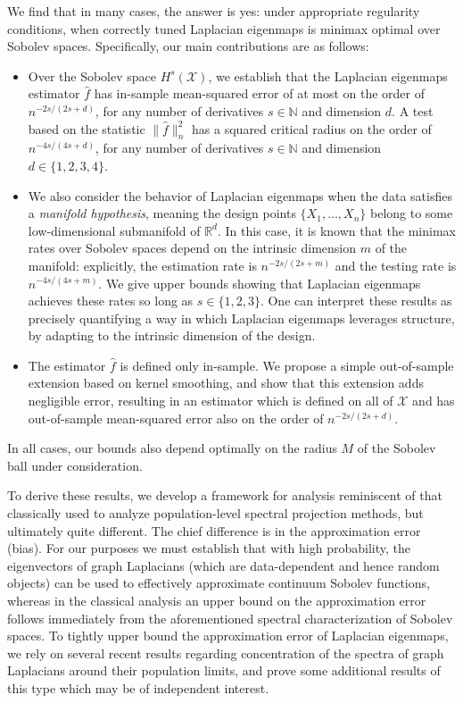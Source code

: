 \documentclass[aos]{imsart}
\theoremstyle{plain}
\theoremstyle{definition}
\theoremstyle{remark}
\def\R{\mathbb{R}}
\newcommand{\wh}[1]{\widehat{#1}}
\newcommand{\mc}[1]{\mathcal{#1}}
\newcommand{\Reals}{\mathbb{R}} %
\newcommand{\Rd}{\Reals^d}
\newcommand{\1}{\mathbf{1}}
\begin{document}
We find that in many cases, the answer is yes: under appropriate regularity conditions, when correctly tuned Laplacian eigenmaps is minimax optimal over Sobolev spaces. Specifically, our main contributions are as follows:
\begin{itemize}
	\item Over the Sobolev space $H^{s}(\mc{X})$, we establish that the Laplacian eigenmaps estimator $\wh{f}$ has in-sample mean-squared error of at most on the order of $n^{-2s/(2s + d)}$, for any number of derivatives $s \in \mathbb{N}$ and dimension $d$. A test based on the statistic $\|\wh{f}\|_n^2$ has a squared critical radius on the order of $n^{-4s/(4s + d)}$, for any number of derivatives $s \in \mathbb{N}$ and dimension $d \in \{1,2,3,4\}$. 
	\item We also consider the behavior of Laplacian eigenmaps when the data satisfies a \emph{manifold hypothesis}, meaning the design points $\{X_1,\ldots,X_n\}$ belong to some low-dimensional submanifold of $\Rd$. In this case, it is known that the minimax rates over Sobolev spaces depend on the intrinsic dimension $m$ of the manifold: explicitly, the estimation rate is $n^{-2s/(2s + m)}$ and the testing rate is $n^{-4s/(4s + m)}$. We give upper bounds showing that Laplacian eigenmaps achieves these rates so long as $s \in \{1,2,3\}$. One can interpret these results as precisely quantifying a way in which Laplacian eigenmaps leverages structure, by adapting to the intrinsic dimension of the design.
	\item The estimator $\wh{f}$ is defined only in-sample. We propose a simple out-of-sample extension based on kernel smoothing, and show that this extension adds negligible error, resulting in an estimator which is defined on all of $\mc{X}$ and has out-of-sample mean-squared error also on the order of $n^{-2s/(2s + d)}$.
\end{itemize}
In all cases, our bounds also depend optimally on the radius $M$ of the Sobolev ball under consideration.

To derive these results, we develop a framework for analysis reminiscent of that  classically used to analyze population-level spectral projection methods, but ultimately quite different. The chief difference is in the approximation error (bias). For our purposes we must establish that with high probability, the eigenvectors of graph Laplacians (which are data-dependent and hence random objects) can be used to effectively approximate continuum Sobolev functions, whereas in the classical analysis an upper bound on the approximation error follows immediately from the aforementioned spectral characterization of Sobolev spaces. To tightly upper bound the approximation error of Laplacian eigenmaps, we rely on several recent results regarding concentration of the spectra of graph Laplacians around their population limits, and prove some additional results of this type which may be of independent interest. 
\end{document}
